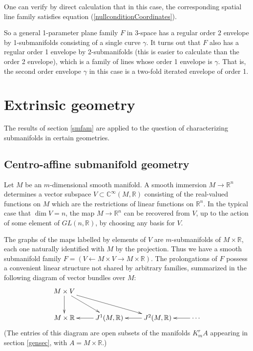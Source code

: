 \documentclass[12pt]{article}
\numberwithin{equation}{section}
\theoremstyle{plain}
\theoremstyle{definition}
\newcommand{\GL}{GL}
\newcommand{\R}{\mathbb{R}}
\newcommand{\C}{\mathbb{C}}
\newcommand{\la}{\leftarrow}
\newcommand{\ra}{\rightarrow}
\begin{document}
One can verify by direct calculation that in this case, the corresponding spatial line family satisfies equation (\ref{nullconditionCoordinates}).

So a general 1-parameter plane family $F$ in 3-space has a regular order 2 envelope by 1-submanifolds consisting of a single curve $\gamma$. It turns out that $F$ also has a regular order 1 envelope by 2-submanifolds (this is easier to calculate than the order 2 envelope), which is a family of lines whose order 1 envelope is $\gamma$. That is, the second order envelope $\gamma$ in this case is a two-fold iterated envelope of order 1.


\section{Extrinsic geometry}\label{extrinsicgeometry}

The results of section \ref{smfam} are applied to the question of characterizing submanifolds in certain geometries.

\subsection{Centro-affine submanifold geometry}\label{casg}

Let $M$ be an $m$-dimensional smooth manifold. A smooth immersion $M\ra \R^{n}$ determines a vector subspace $V\subset \C^{\infty}(M,\R)$ consisting of the real-valued functions on $M$ which are the restrictions of linear functions on $\R^{n}$. In the typical case that $\dim V = n$, the map $M\ra \R^{n}$ can be recovered from $V$, up to the action of some element of $\GL(n,\R)$, by choosing any basis for $V$.

The graphs of the maps labelled by elements of $V$ are $m$-submanifolds of $M\times \R$, each one naturally identified with $M$ by the projection. Thus we have a smooth submanifold family $F=(V\la M\times V \ra M\times \R)$. The prolongations of $F$ possess a convenient linear structure not shared by arbitrary families, summarized in the following diagram of vector bundles over $M$:
\begin{align*}
\xymatrix{
M\times V \ar[d]\ar[dr]\ar[drr] &                   &                   & \\
M\times \R                       & J^{1}(M,\R) \ar[l]& J^{2}(M,\R) \ar[l]& \cdots\ar[l]}
\end{align*}
(The entries of this diagram are open subsets of the manifolds $K^{r}_{m}A$ appearing in section \ref{gensec}, with $A=M\times \R$.)
\end{document}
